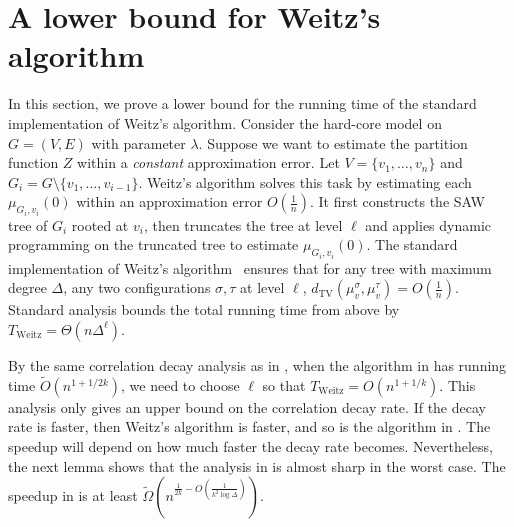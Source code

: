 \documentclass[11pt]{amsart}
\makeatletter
\theoremstyle{definition}
\theoremstyle{remark}
\def\listtodoname{Todo list}
\def\listoftodos{\@starttoc{tdo}\listtodoname}
\newcommand{\dTV}{d_{\mathrm{TV}}}
\makeatother
\begin{document}

\section{A lower bound for Weitz's algorithm}\label{sec:lb-Weitz}

In this section, we prove a lower bound for the running time of the standard implementation of Weitz's algorithm.
Consider the hard-core model on $G=(V,E)$ with parameter $\lambda$.
Suppose we want to estimate the partition function $Z$ within a \emph{constant} approximation error.
Let $V=\{v_1,\ldots,v_n\}$ and $G_i = G\setminus \{v_1,\ldots,v_{i-1}\}$.
Weitz's algorithm solves this task by estimating each $\mu_{G_i,v_i}(0)$ within an approximation error $ O(\frac{1}{n})$.  
It first constructs the SAW tree of $G_i$ rooted at $v_i$, then truncates the tree at level $\ell$ and applies dynamic programming on the truncated tree to estimate $\mu_{G_i,v_i}(0)$.
The standard implementation of Weitz's algorithm~\cite{Wei06,LLY13} ensures that for any tree with maximum degree $\Delta$, any two configurations $\sigma,\tau$ at level $\ell$, $\dTV(\mu_v^{\sigma},\mu_v^{\tau}) = O(\frac{1}{n})$. 
Standard analysis bounds the total running time from above by $T_{\mathrm{Weitz}} = \Theta(n \Delta^\ell)$.

By the same correlation decay analysis as in ,
when the algorithm in  has running time $\widetilde{O}(n^{1+1/2k})$,
we need to choose $\ell$ so that $T_{\mathrm{Weitz}}=O(n^{1+1/k})$.
This analysis only gives an upper bound on the correlation decay rate.
If the decay rate is faster, then Weitz's algorithm is faster,
and so is the algorithm in .
The speedup will depend on how much faster the decay rate becomes.
Nevertheless, the next lemma shows that the analysis in  is almost sharp in the worst case.
The speedup in  is at least $\widetilde{\Omega}\left(n^{\frac{1}{2k}-O(\frac{1}{k^2\log\Delta})}\right)$.

\end{document}
